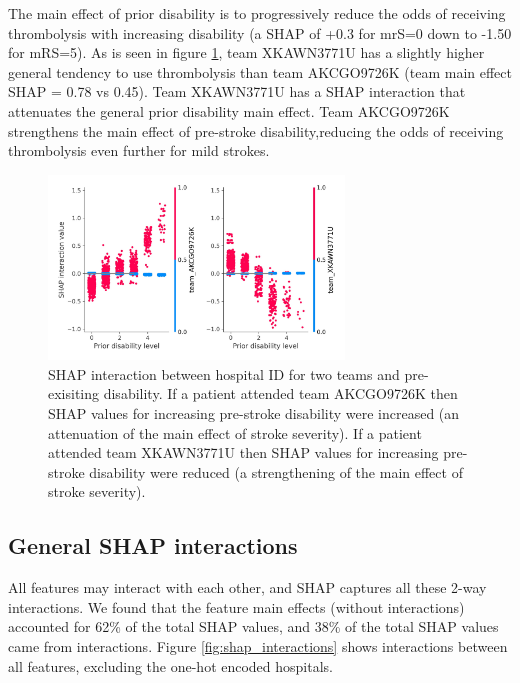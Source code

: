 The main effect of prior disability is to progressively reduce the odds of receiving thrombolysis with increasing disability (a SHAP of +0.3 for mrS=0 down to -1.50 for mRS=5). As is seen in figure \ref{fig:interaction_mrs}, team XKAWN3771U has a slightly higher general tendency to use thrombolysis than team AKCGO9726K (team main effect SHAP = 0.78 vs 0.45). Team XKAWN3771U has a SHAP interaction that attenuates the general prior disability main effect. Team AKCGO9726K strengthens the main effect of pre-stroke disability,reducing the odds of receiving thrombolysis even further for mild strokes.

\begin{figure}
\centering
\includegraphics[width=0.7\textwidth]{./images/12ac_disability_interaction_example}
\caption{SHAP interaction between hospital ID for two teams and pre-exisiting disability. If a patient attended team AKCGO9726K then SHAP values for increasing pre-stroke disability were increased (an attenuation of the main effect of stroke severity). If a patient attended team XKAWN3771U then SHAP values for increasing pre-stroke disability were reduced (a strengthening of the main effect of stroke severity).}
\label{fig:interaction_mrs}
\end{figure}


\subsection{General SHAP interactions}

All features may interact with each other, and SHAP captures all these 2-way interactions. We found that the feature main effects (without interactions) accounted for 62\% of the total SHAP values, and 38\% of the total SHAP values came from interactions. Figure \ref{fig:shap_interactions} shows interactions between all features, excluding the one-hot encoded hospitals.

